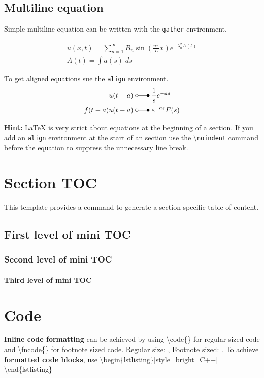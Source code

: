 \documentclass[\fontheight]{extarticle}
\begin{document}
\begin{multicols*}{3}
    \subsection{Multiline equation}
    Simple multiline equation can be written with the \texttt{gather} environment.
    
    \begin{gather*}
        u(x,t) =\sum_{n=1}^\infty B_n\sin(\frac{n\pi}Lx)e^{-\lambda_n^2 A(t)} \\
        A(t)=\int a(s)\;ds
    \end{gather*}
    
    To get aligned equations sue the \texttt{align} environment.
    \begin{align*}
        u(t-a)       \; & \laplace\; \frac{1}{s}e^{-as} \\
        f(t-a)u(t-a) \; & \laplace\; e^{-as}F(s)
    \end{align*}
    
    \textbf{Hint:} \LaTeX{} is very strict about equations at the beginning of a section.
    If you add an \texttt{align} environment at the start of an section use the
    \textbackslash{}\texttt{noindent} command before the equation to suppress the unnecessary
    line break.
    
    \section{Section TOC}
    This template provides a command to generate a section specific table of content.
    \createsectiontoc{}
    
    \subsection{First level of mini TOC}
    \subsubsection{Second level of mini TOC}
    \paragraph{Third level of mini TOC}
    
    \section{Code}
    \textbf{Inline code formatting} can be achieved by using \textbackslash{code}\{\} for regular sized code
    and \textbackslash{fncode}\{\} for footnote sized code.\newline
    Regular size: ,\newline
    Footnote sized: .
    \newpar{}
    To achieve \textbf{formatted code blocks}, use \newline
    \textbackslash{begin}\{lstlisting\}[style=bright\_C++]\newline
    \newline
    \textbackslash{end}\{lstlisting\}
    

\end{multicols*}
\end{document}
